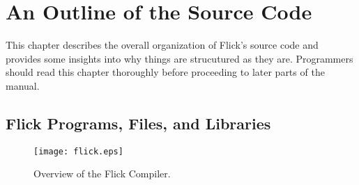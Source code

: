 


\chapter{An Outline of the Source Code}
\label{cha:Coding}

This chapter describes the overall organization of Flick's source code and
provides some insights into why things are strucutured as they are.
Programmers should read this chapter thoroughly before proceeding to later
parts of the manual.



\section{Flick Programs, Files, and Libraries}
\label{sec:Coding:Flick Programs, Files, and Libraries}

\begin{figure}
  \begin{center}
    \texttt{[image: flick.eps]}
  \end{center}
  \caption{Overview of the Flick \IDL{} Compiler.}
  \label{fig:Coding:Flick}
\end{figure}


